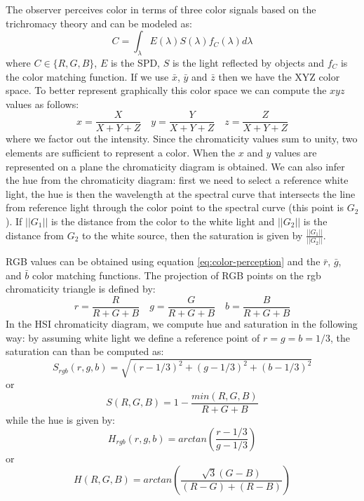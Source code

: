 \documentclass[a4paper,twocolumn]{article}
\begin{document}
The observer perceives color in terms of three color signals based on the
trichromacy theory and can be modeled as:
\begin{equation} \label{eq:color-perception}
C = \int_{\lambda} E(\lambda) S(\lambda) f_C(\lambda) d\lambda
\end{equation}
where $C \in \{R, G, B\}$, $E$ is the SPD, $S$ is the light reflected by objects
and $f_C$ is the color matching function. If we use $\bar{x}$, $\bar{y}$ and
$\bar{z}$ then we have the XYZ color space. To better represent graphically this
color space we can compute the $xyz$ values as follows:
\begin{equation}
x = \frac{X}{X + Y + Z} \quad y = \frac{Y}{X + Y + Z} \quad z = \frac{Z}{X + Y + Z}
\end{equation}
where we factor out the intensity. Since the chromaticity values sum to unity,
two elements are sufficient to represent a color. When the $x$ and $y$ values
are represented on a plane the chromaticity diagram is obtained. We can also
infer the hue from the chromaticity diagram: first we need to select a reference
white light, the hue is then the wavelength at the spectral curve that
intersects the line from reference light through the color point to the spectral
curve (this point is $G_2$). If $||G_1||$ is the distance from the color to the
white light and $||G_2||$ is the distance from $G_2$ to the white source, then
the saturation is given by $\frac{||G_1||}{||G_2||}$.

RGB values can be obtained using equation \ref{eq:color-perception} and the
$\bar{r}$, $\bar{g}$, and $\bar{b}$ color matching functions. The projection of
RGB points on the rgb chromaticity triangle is defined by:
\begin{equation}
r = \frac{R}{R + G + B} \quad g = \frac{G}{R + G + B} \quad b = \frac{B}{R + G + B}
\end{equation}
In the HSI chromaticity diagram, we compute hue and saturation in the following
way: by assuming white light we define a reference point of $r = g = b = 1/3$,
the saturation can than be computed as:
\begin{equation}
S_{rgb}(r, g, b) = \sqrt{(r - 1/3)^2 + (g - 1/3)^2 + (b - 1/3)^2}
\end{equation}
or
\begin{equation}
S(R, G, B) = 1 - \frac{min(R, G, B)}{R + G + B}
\end{equation}
while the hue is given by:
\begin{equation}
H_{rgb}(r, g, b) = arctan(\frac{r - 1/3}{g - 1/3})
\end{equation}
or
\begin{equation}
H(R, G, B) = arctan(\frac{\sqrt{3}(G - B)}{(R - G) + (R - B)})
\end{equation}
\end{document}
